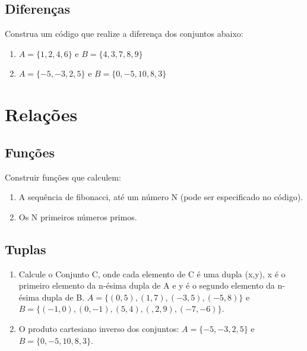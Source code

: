 \documentclass[paper=a4, fontsize=11pt]{scrartcl} %
\numberwithin{equation}{section} %
\numberwithin{figure}{section} %
\numberwithin{table}{section} %
\begin{document}
\subsection{Diferenças}

Construa um código que realize a diferença dos conjuntos abaixo:
\begin{enumerate}

\item $A = \{ 1, 2, 4, 6\}$ e $B = \{ 4, 3, 7, 8, 9 \}$

\item $A = \{ -5, -3, 2, 5\}$ e $B = \{ 0, -5, 10, 8, 3 \}$


\end{enumerate}




\newpage
\section{Relações}

\subsection{Funções}

Construir funções que calculem:

\begin{enumerate}

\item  A sequência de fibonacci, até um número N (pode ser especificado no código).

\item Os N primeiros números primos.


\end{enumerate}


\subsection{Tuplas}

\begin{enumerate}

\item  Calcule o Conjunto C, onde cada elemento de C é uma dupla (x,y), x é o primeiro elemento da n-ésima dupla de A e y é o segundo elemento da n-ésima dupla de B.  $A = \{(0,5),(1,7),(-3,5),(-5,8)\}$ e $B = \{(-1,0),(0,-1),(5,4),(,2,9),(-7,-6) \}$.

\item O produto cartesiano inverso dos conjuntos: $A = \{ -5, -3, 2, 5\}$ e $B = \{ 0, -5, 10, 8, 3 \}$.


\end{enumerate}
\end{document}
